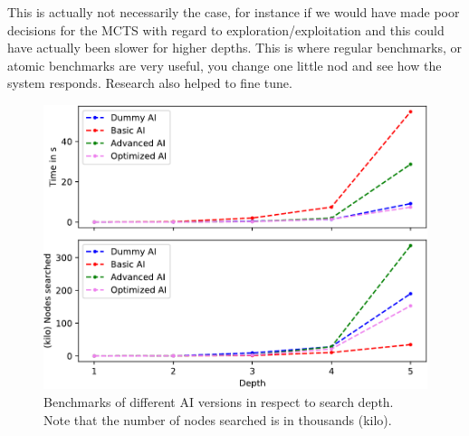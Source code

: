 \pagebreak

This is actually not necessarily the case,
for instance if we would have made poor decisions for the MCTS
with regard to exploration/exploitation and this could have actually been
slower for higher depths. This is where regular benchmarks, or atomic
benchmarks are very useful, you change one little nod and see how the
system responds. Research also helped to fine tune.

\begin{figure}[hbtp]
	\centering
	\includegraphics[width=.8\linewidth, page=1]{reference/pics/plot-depths.pdf}
	\captionsetup{justification=centering}
	\caption{Benchmarks of different AI versions in respect to search depth.\\Note that the number of nodes searched is in thousands (kilo).}
	\label{fig:depth-plot}
\end{figure}

\pagebreak

